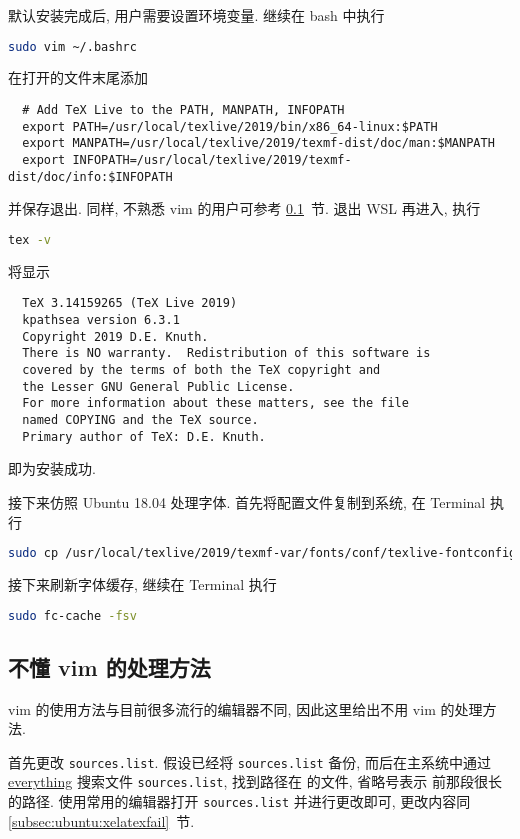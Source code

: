 默认安装完成后, 用户需要设置环境变量.
继续在 \textsf{bash} 中执行
\begin{lstlisting}[language = bash]
  sudo vim ~/.bashrc
\end{lstlisting}
在打开的文件末尾添加
\begin{lstlisting}
  # Add TeX Live to the PATH, MANPATH, INFOPATH
  export PATH=/usr/local/texlive/2019/bin/x86_64-linux:$PATH
  export MANPATH=/usr/local/texlive/2019/texmf-dist/doc/man:$MANPATH
  export INFOPATH=/usr/local/texlive/2019/texmf-dist/doc/info:$INFOPATH
\end{lstlisting}
并保存退出.
同样, 不熟悉 \textsf{vim} 的用户可参考 \ref{subsec:no-vim}~节.
退出 WSL 再进入, 执行
\begin{lstlisting}[language=bash]
  tex -v
\end{lstlisting}
将显示
\begin{lstlisting}
  TeX 3.14159265 (TeX Live 2019)
  kpathsea version 6.3.1
  Copyright 2019 D.E. Knuth.
  There is NO warranty.  Redistribution of this software is
  covered by the terms of both the TeX copyright and
  the Lesser GNU General Public License.
  For more information about these matters, see the file
  named COPYING and the TeX source.
  Primary author of TeX: D.E. Knuth.
\end{lstlisting}
即为安装成功.

接下来仿照 Ubuntu 18.04 处理字体.
首先将配置文件复制到系统,
在 \textsf{Terminal} 执行
\begin{lstlisting}[language=bash]
  sudo cp /usr/local/texlive/2019/texmf-var/fonts/conf/texlive-fontconfig.conf /etc/fonts/conf.d/09-texlive.conf
\end{lstlisting}
接下来刷新字体缓存,
继续在 \textsf{Terminal} 执行
\begin{lstlisting}[language=bash]
  sudo fc-cache -fsv
\end{lstlisting}

\subsection{不懂 \textsf{vim} 的处理方法}\label{subsec:no-vim}

\textsf{vim} 的使用方法与目前很多流行的编辑器不同,
因此这里给出不用 \textsf{vim} 的处理方法.

首先更改 \texttt{sources.list}.
假设已经将 \texttt{sources.list} 备份,
而后在主系统中通过 \href{https://www.voidtools.com/zh-cn/}{everything}
搜索文件 \texttt{sources.list},
找到路径在  的文件,
省略号表示  前那段很长的路径.
使用常用的编辑器打开 \texttt{sources.list} 并进行更改即可,
更改内容同 \ref{subsec:ubuntu:xelatexfail}~节.

